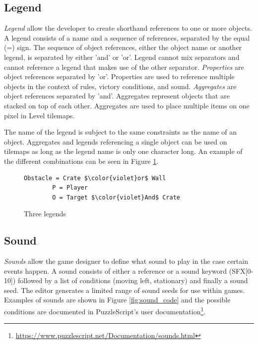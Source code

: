 \subsection{Legend}
\emph{Legend} allow the developer to create shorthand references to one or more objects. A legend consists of a name and a sequence of references, separated by the equal (=) sign. The sequence of object references, either the object name or another legend, is separated by either 'and' or 'or'. Legend cannot mix separators and cannot reference a legend that makes use of the other separator. \emph{Properties} are object references separated by 'or'. Properties are used to reference multiple objects in the context of rules, victory conditions, and sound. \emph{Aggregates} are object references separated by 'and'. Aggregates represent objects that are stacked on top of each other. Aggregates are used to place multiple items on one pixel in Level tilemaps.

The name of the legend is subject to the same constraints as the name of an object. Aggregates and legends referencing a single object can be used on tilemaps as long as the legend name is only one character long. An example of the different combinations can be seen in Figure \ref{fig:legend_code}.

\begin{figure}
    \centering
    \begin{lstlisting}[language=PuzzleScript]
        Obstacle = Crate $\color{violet}or$ Wall
        P = Player
        O = Target $\color{violet}And$ Crate
    \end{lstlisting}
    \caption{Three legends}
    \label{fig:legend_code}
\end{figure}

\subsection{Sound}
\emph{Sounds} allow the game designer to define what sound to play in the case certain events happen. A sound consists of either a reference or a sound keyword (SFX[0-10]) followed by a list of conditions (moving left, stationary) and finally a sound seed. The editor generates a limited range of sound seeds for use within games. Examples of sounds are shown in Figure \ref{fig:sound_code} and the possible conditions are documented in PuzzleScript's user documentation\footnote{\url{https://www.puzzlescript.net/Documentation/sounds.html}}.

